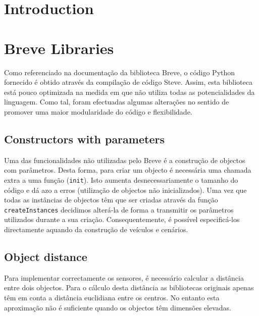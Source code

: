 \documentclass[a4paper]{article}
\title{\documentTitle}
\author{\documentAuthors{}}
\begin{document}
\renewcommand{\figurename}{Figure}
\maketitle
\cleardoublepage

\tableofcontents
\cleardoublepage

\setlength{\parindent}{1cm}
\setlength{\parskip}{0.3cm}

\section{Introduction}

\cleardoublepage
\section{Breve Libraries}
\indent \indent Como referenciado na documentação da biblioteca Breve, o código Python fornecido é obtido através da compilação de código Steve.
Assim, esta biblioteca está pouco optimizada na medida em que não utiliza todas as potencialidades da linguagem.
Como tal, foram efectuadas algumas alterações no sentido de promover uma maior modularidade do código e flexibilidade.

\cleardoublepage

\subsection{Constructors with parameters}
\indent \indent Uma das funcionalidades não utilizadas pelo Breve é a construção de objectos com parâmetros.
Desta forma, para criar um objecto é necessária uma chamada extra a uma função (\texttt{init}).
Isto aumenta desnecessariamente o tamanho do código e dá azo a erros (utilização de objectos não inicializados).
Uma vez que todas as instâncias de objectos têm que ser criadas através da função \texttt{createInstances} decidimos alterá-la de forma a transmitir os parâmetros utilizados durante a sua criação.
Consequentemente, é possível especificá-los directamente aquando da construção de veículos e cenários.

\subsection{Object distance}
\indent \indent Para implementar correctamente os sensores, é necessário calcular a distância entre dois objectos.
Para o cálculo desta distância as bibliotecas originais apenas têm em conta a distância euclidiana entre os centros.
No entanto esta aproximação não é suficiente quando os objectos têm dimensões elevadas.
\end{document}
